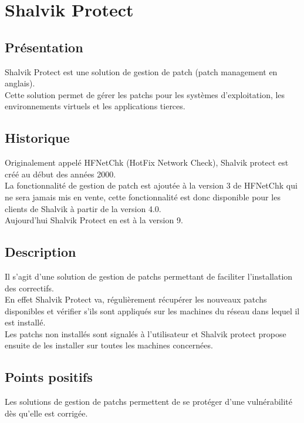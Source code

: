 \section{Shalvik Protect}
\thispagestyle{plain}
\subsection{Présentation}
Shalvik Protect est une solution de gestion de patch (patch management en anglais).\\
Cette solution permet de gérer les patchs pour les systèmes d’exploitation, les environnements virtuels et les applications tierces.\\

\subsection{Historique}
Originalement appelé HFNetChk (HotFix Network Check), Shalvik protect est créé au début des années 2000.\\
La fonctionnalité de gestion de patch est ajoutée à la version 3 de HFNetChk qui ne sera jamais mis en vente, cette fonctionnalité est donc disponible pour les clients de Shalvik à partir de la version 4.0.\\
Aujourd’hui Shalvik Protect en est à la version 9.\\

\subsection{Description}
Il s'agit d'une solution de gestion de patchs permettant de faciliter l’installation des correctifs.\\
En effet Shalvik Protect va, régulièrement récupérer les nouveaux patchs disponibles et vérifier s'ils sont appliqués sur les machines du réseau dans lequel il est installé.\\
Les patchs  non installés sont signalés à l’utilisateur et Shalvik protect propose ensuite de les installer sur toutes les machines concernées.\\


\subsection{Points positifs}
Les solutions de gestion de patchs permettent de se protéger d’une vulnérabilité dès qu’elle est corrigée.\\

